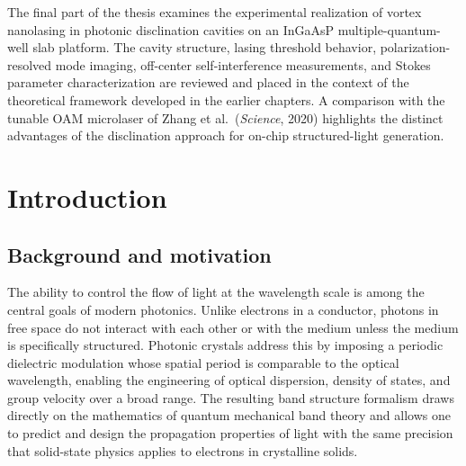 \documentclass[12pt,a4paper,oneside]{book}
\theoremstyle{plain}
\theoremstyle{definition}
\theoremstyle{remark}
\begin{document}
The final part of the thesis examines the experimental realization of vortex nanolasing in photonic disclination cavities on an InGaAsP multiple-quantum-well slab platform. The cavity structure, lasing threshold behavior, polarization-resolved mode imaging, off-center self-interference measurements, and Stokes parameter characterization are reviewed and placed in the context of the theoretical framework developed in the earlier chapters. A comparison with the tunable OAM microlaser of Zhang et al.\ (\textit{Science}, 2020) highlights the distinct advantages of the disclination approach for on-chip structured-light generation.

{\hypersetup{linkcolor=black}%
  \tableofcontents
  \listoffigures
  \listoftables
}

\mainmatter
\pagestyle{mainpages}

\chapter{Introduction}
\label{chap:introduction}

\section{Background and motivation}

The ability to control the flow of light at the wavelength scale is among the central goals of modern photonics. Unlike electrons in a conductor, photons in free space do not interact with each other or with the medium unless the medium is specifically structured. Photonic crystals address this by imposing a periodic dielectric modulation whose spatial period is comparable to the optical wavelength, enabling the engineering of optical dispersion, density of states, and group velocity over a broad range. The resulting band structure formalism draws directly on the mathematics of quantum mechanical band theory and allows one to predict and design the propagation properties of light with the same precision that solid-state physics applies to electrons in crystalline solids.
\end{document}

